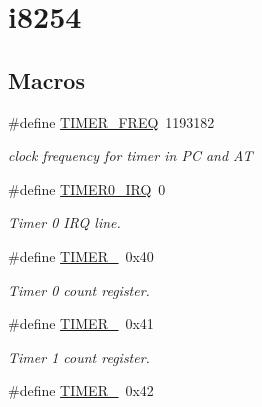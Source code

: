 \hypertarget{group__i8254}{}\section{i8254}
\label{group__i8254}
\subsection*{Macros}
\begin{DoxyCompactItemize}
\item 
\mbox{\label{group__i8254_gacf926951944b6cf370b7229ebd50dd8b}} 
\#define \hyperlink{group__i8254_gacf926951944b6cf370b7229ebd50dd8b}{T\+I\+M\+E\+R\+\_\+\+F\+R\+EQ}~1193182
\begin{DoxyCompactList}\small\item\em clock frequency for timer in PC and AT \end{DoxyCompactList}\item 
\mbox{\label{group__i8254_ga30bf84c312af248cb81bb224e09f9ba8}} 
\#define \hyperlink{group__i8254_ga30bf84c312af248cb81bb224e09f9ba8}{T\+I\+M\+E\+R0\+\_\+\+I\+RQ}~0
\begin{DoxyCompactList}\small\item\em Timer 0 I\+RQ line. \end{DoxyCompactList}\item 
\mbox{\label{group__i8254_gacc9ff9df4a9674a1ce9ba08fc4a4679e}} 
\#define \hyperlink{group__i8254_gacc9ff9df4a9674a1ce9ba08fc4a4679e}{T\+I\+M\+E\+R\+\_}~0x40
\begin{DoxyCompactList}\small\item\em Timer 0 count register. \end{DoxyCompactList}\item 
\mbox{\label{group__i8254_gac62c99c2a9289891c1b83052242cca49}} 
\#define \hyperlink{group__i8254_gac62c99c2a9289891c1b83052242cca49}{T\+I\+M\+E\+R\+\_}~0x41
\begin{DoxyCompactList}\small\item\em Timer 1 count register. \end{DoxyCompactList}\item 
\mbox{\label{group__i8254_ga1f34f18ad0ab8cace46b615773b48735}} 
\#define \hyperlink{group__i8254_ga1f34f18ad0ab8cace46b615773b48735}{T\+I\+M\+E\+R\+\_}~0x42

\end{DoxyCompactItemize}
